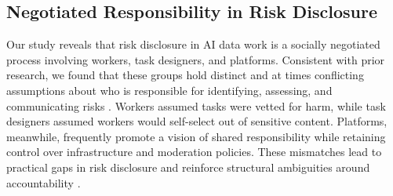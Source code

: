\subsection{Negotiated Responsibility in Risk Disclosure}
Our study reveals that risk disclosure in AI data work is a socially negotiated process involving workers, task designers, and platforms. Consistent with prior research, we found that these groups hold distinct and at times conflicting assumptions about who is responsible for identifying, assessing, and communicating risks \cite{fieseler_unfairness_2019}. Workers assumed tasks were vetted for harm, while task designers assumed workers would self-select out of sensitive content. Platforms, meanwhile, frequently promote a vision of shared responsibility while retaining control over infrastructure and moderation policies. These mismatches lead to practical gaps in risk disclosure and reinforce structural ambiguities around accountability \cite{Suchman2002LocatedAccountabilities, widder_dislocated_2023}.

